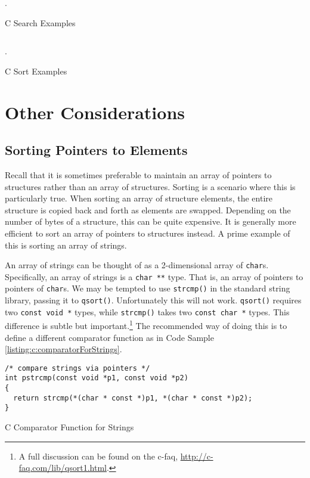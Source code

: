 \begin{listing}[H]
\inputminted[fontsize=\scriptsize]{c}{code/searchDemo.c}.
\caption{C Search Examples}
\label{code:c:searchExamples}
\end{listing}

\begin{listing}[H]
\inputminted[]{c}{code/sortDemo.c}.
\caption{C Sort Examples}
\label{code:c:sortExamples}
\end{listing}

\section{Other Considerations}

\subsection{Sorting Pointers to Elements}

Recall that it is sometimes preferable to maintain an array of pointers
to structures rather than an array of structures.  Sorting is a scenario
where this is particularly true.  When sorting an array of structure
elements, the entire structure is copied back and forth as elements
are swapped.  Depending on the number of bytes of a structure, this can
be quite expensive.  It is generally more efficient to sort an array of 
pointers to structures instead.  A prime example of this is sorting an
array of strings.

An array of strings can be thought of as a 2-dimensional array of 
\texttt{char}s.  Specifically, an array of strings is a 
\texttt{char **} type.  That is, an array of pointers to 
pointers of \texttt{char}s.  We may be tempted to use 
\texttt{strcmp()} in the standard string library, passing it 
to \texttt{qsort()}.  
Unfortunately this will not work.  \texttt{qsort()} requires 
two \texttt{const void *} types, while \texttt{strcmp()} 
takes two \texttt{const char *} types.  This difference is 
subtle but important.\footnote{A full discussion can be found on the 
c-faq, \url{http://c-faq.com/lib/qsort1.html}.}  The recommended way 
of doing this is to define a different comparator function as 
in Code Sample \ref{listing:c:comparatorForStrings}.

\begin{listing}[H]
\begin{verbatim}
/* compare strings via pointers */
int pstrcmp(const void *p1, const void *p2)
{
  return strcmp(*(char * const *)p1, *(char * const *)p2);
}
\end{verbatim}
\caption{C Comparator Function for Strings}
\label{listing:c:comparatorForStrings}
\end{listing}

